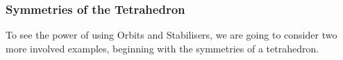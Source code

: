 \documentclass[a4paper]{scrartcl}
\begin{document}
\subsubsection{Symmetries of the Tetrahedron}

To see the power of using Orbits and Stabilisers, we are going to consider two more involved examples, beginning with the symmetries of a tetrahedron.

\begin{center}
	


\begin{tikzpicture}[x=0.75pt,y=0.75pt,yscale=-1,xscale=1]


\end{tikzpicture}
\end{center}
\end{document}
